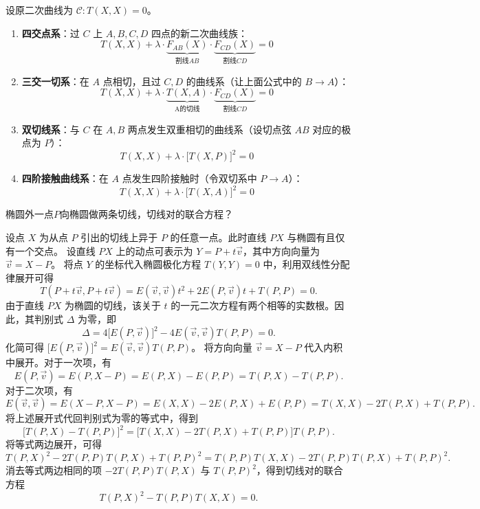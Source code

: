 \begin{conclusion}[几类常见交点曲线系]
设原二次曲线为 $\mathcal{C}: T(X,X)=0$。
\begin{enumerate}
    \item \textbf{四交点系}：过 $C$ 上 $A, B, C, D$ 四点的新二次曲线族：$$ T(X,X) + \lambda \cdot \underbrace{F_{AB}(X)}_{\text{割线}AB} \cdot \underbrace{F_{CD}(X)}_{\text{割线}CD} = 0 $$
    \item \textbf{三交一切系}：在 $A$ 点相切，且过 $C, D$ 的曲线系（让上面公式中的 $B \to A$）：$$ T(X,X) + \lambda \cdot \underbrace{T(X,A)}_{\text{A的切线}} \cdot \underbrace{F_{CD}(X)}_{\text{割线}CD}  = 0 $$
    \item \textbf{双切线系}：与 $C$ 在 $A, B$ 两点发生双重相切的曲线系（设切点弦 $AB$ 对应的极点为 $P$）：$$ T(X,X) + \lambda \cdot \big[T(X,P)\big]^2 = 0 $$
    \item \textbf{四阶接触曲线系}：在 $A$ 点发生四阶接触时（令双切系中 $P \to A$）：$$ T(X,X) + \lambda \cdot \big[T(X,A)\big]^2 = 0 $$
\end{enumerate}
\end{conclusion}

\begin{exercise}
椭圆外一点$P$向椭圆做两条切线，切线对的联合方程？
\end{exercise}
\begin{solution}
设点 $X$ 为从点 $P$ 引出的切线上异于 $P$ 的任意一点。此时直线 $PX$ 与椭圆有且仅有一个交点。
设直线 $PX$ 上的动点可表示为 $Y = P + t\vec{v}$，其中方向向量为 $\vec{v} = X - P$。
将点 $Y$ 的坐标代入椭圆极化方程 $T(Y,Y) = 0$ 中，利用双线性分配律展开可得
\[ T(P + t\vec{v}, P + t\vec{v}) = E(\vec{v},\vec{v})t^2 + 2E(P,\vec{v})t + T(P,P) = 0. \]
由于直线 $PX$ 为椭圆的切线，该关于 $t$ 的一元二次方程有两个相等的实数根。因此，其判别式 $\Delta$ 为零，即
\[ \Delta = 4\big[E(P,\vec{v})\big]^2 - 4E(\vec{v},\vec{v})T(P,P) = 0. \]
化简可得 $\big[E(P,\vec{v})\big]^2 = E(\vec{v},\vec{v})T(P,P)$。
将方向向量 $\vec{v} = X - P$ 代入内积中展开。对于一次项，有
\[ E(P, \vec{v}) = E(P, X - P) = E(P,X) - E(P,P) = T(P,X) - T(P,P). \]
对于二次项，有
\[ E(\vec{v}, \vec{v}) = E(X - P, X - P) = E(X,X) - 2E(P,X) + E(P,P) = T(X,X) - 2T(P,X) + T(P,P). \]
将上述展开式代回判别式为零的等式中，得到
\[ \big[T(P,X) - T(P,P)\big]^2 = \big[T(X,X) - 2T(P,X) + T(P,P)\big] T(P,P). \]
将等式两边展开，可得
\[ T(P,X)^2 - 2T(P,P)T(P,X) + T(P,P)^2 = T(P,P)T(X,X) - 2T(P,P)T(P,X) + T(P,P)^2. \]
消去等式两边相同的项 $-2T(P,P)T(P,X)$ 与 $T(P,P)^2$，得到切线对的联合方程
\[ T(P,X)^2 - T(P,P)T(X,X) = 0. \]
\end{solution}

